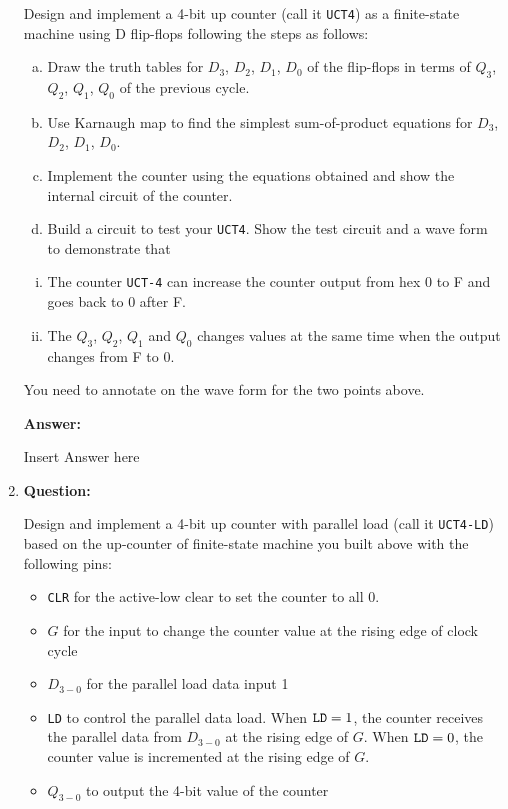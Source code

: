 \documentclass[11pt]{article}
\begin{document}
\begin{enumerate}
{	Design and implement a 4-bit up counter (call it {\tt UCT4}) as a
	finite-state machine using D flip-flops following the steps as follows:
	\begin{enumerate}[(a)]
		\item {
			Draw the truth tables for $D_3$, $D_2$, $D_1$, $D_0$ of the flip-flops in terms of
			$Q_3$, $Q_2$, $Q_1$, $Q_0$ of the previous cycle.
		} \item {
			Use Karnaugh map to find the simplest sum-of-product equations for
			$D_3$, $D_2$, $D_1$, $D_0$.
		} \item {
			Implement the counter using the equations obtained and show the internal
			circuit of the counter.
		} \item {
			Build a circuit to test your {\tt UCT4}. Show the test circuit and a wave form to
			demonstrate that
		}
	\end{enumerate}
	\begin{enumerate}[i.]
		\item {
			The counter {\tt UCT-4} can increase the counter output from hex 0 to F and
			goes back to 0 after F.
		} \item {
			The $Q_3$, $Q_2$, $Q_1$ and $Q_0$ changes values at the same time
			when the output changes from F to 0.
		}
	\end{enumerate}

	You need to annotate on the wave form for the two points above.

	{\bf Answer:}

	Insert Answer here
}

\item{
	{\bf Question:}

	Design and implement a 4-bit up counter with parallel load
	(call it {\tt UCT4-LD}) based on the up-counter of finite-state
	machine you built above with the following pins:
	\begin{itemize}
		\item {
			{\tt CLR} for the active-low clear to set the counter to all 0.
		} \item {
			$G$ for the input to change the counter value at the rising edge of clock cycle
		} \item {
			$D_{3−0}$ for the parallel load data input 1
		} \item {
			{\tt LD} to control the parallel data load.
			When $\text{\tt LD} = 1$, the counter receives the parallel
			data from $D_{3−0}$ at the rising edge of $G$.
			When $\text{\tt LD} = 0$, the counter value is incremented
			at the rising edge of $G$.
		} \item {
			$Q_{3−0}$ to output the 4-bit value of the counter
		}
	\end{itemize}

}
\end{enumerate}
\end{document}
